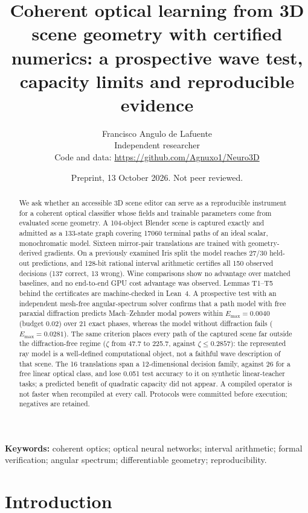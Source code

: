 \documentclass[11pt,a4paper]{article}
\title{\bfseries Coherent optical learning from 3D scene geometry with certified numerics: a prospective wave test, capacity limits and reproducible evidence}
\author{Francisco Angulo de Lafuente\\[2pt]
\small Independent researcher\\
\small Code and data: \url{https://github.com/Agnuxo1/Neuro3D}}
\date{\small Preprint, 13 October 2026. Not peer reviewed.}
\newcommand{\Emax}{E_{\max}}
\begin{document}
\maketitle

\begin{abstract}
\noindent
We ask whether an accessible 3D scene editor can serve as a reproducible instrument for a coherent optical classifier whose fields and trainable parameters come from evaluated scene geometry. A 104-object Blender scene is captured exactly and admitted as a 133-state graph covering \num{17060} terminal paths of an ideal scalar, monochromatic model. Sixteen mirror-pair translations are trained with geometry-derived gradients. On a previously examined Iris split the model reaches 27/30 held-out predictions, and 128-bit rational interval arithmetic certifies all 150 observed decisions (137 correct, 13 wrong). Wine comparisons show no advantage over matched baselines, and no end-to-end GPU cost advantage was observed. Lemmas T1--T5 behind the certificates are machine-checked in Lean~4. A prospective test with an independent mesh-free angular-spectrum solver confirms that a path model with free paraxial diffraction predicts Mach--Zehnder modal powers within $\Emax = 0.0040$ (budget 0.02) over 21 exact phases, whereas the model without diffraction fails ($\Emax = 0.0281$). The same criterion places every path of the captured scene far outside the diffraction-free regime ($\zeta$ from 47.7 to 225.7, against $\zeta \le 0.2857$): the represented ray model is a well-defined computational object, not a faithful wave description of that scene. The 16 translations span a 12-dimensional decision family, against 26 for a free linear optical class, and lose 0.051 test accuracy to it on synthetic linear-teacher tasks; a predicted benefit of quadratic capacity did not appear. A compiled operator is not faster when recompiled at every call. Protocols were committed before execution; negatives are retained.
\end{abstract}

\noindent\textbf{Keywords:} coherent optics; optical neural networks; interval arithmetic; formal verification; angular spectrum; differentiable geometry; reproducibility.

\section{Introduction}
\label{sec:intro}
\end{document}
